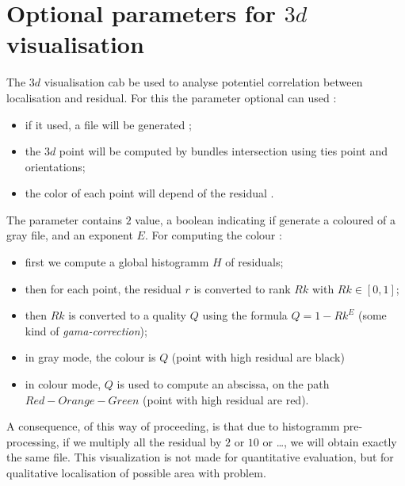 \documentclass[a4paper]{article}
\begin{document}

\section{Optional parameters  for  $3d$ visualisation}

The $3d$ visualisation cab be used to analyse potentiel correlation between localisation 
and residual. For this the parameter optional   can used :

\begin{itemize}
    \item  if it used, a file  will be generated ;

    \item  the $3d$ point will be computed by bundles intersection using ties point and orientations;

    \item the color of each point will depend of the residual .
           
\end{itemize}



The parameter   contains $2$ value, a boolean indicating if generate
a coloured of a gray file, and an exponent $E$.
For computing the colour :

\begin{itemize}
   \item  first we compute a global histogramm $H$ of residuals;
   \item  then for each point, the residual $r$ is converted to rank  $Rk$ with $Rk \in [0,1]$;
   \item  then $Rk$ is converted to a quality $Q$ using the formula $Q=1-Rk^E$ (some kind of \emph{gama-correction});
   \item  in gray mode, the colour is $Q$  (point with high residual are black)
   \item  in colour mode, $Q$ is used to compute an  abscissa,  on the path $Red-Orange-Green$ 
         (point with high residual are red).
\end{itemize}


A consequence, of this way of proceeding, is that due to histogramm pre-processing, if we multiply all the
residual by $2$ or $10$ or \dots , we will obtain exactly the same file.  This visualization is not
made for  quantitative evaluation, but for qualitative localisation of possible area with problem.
\end{document}
